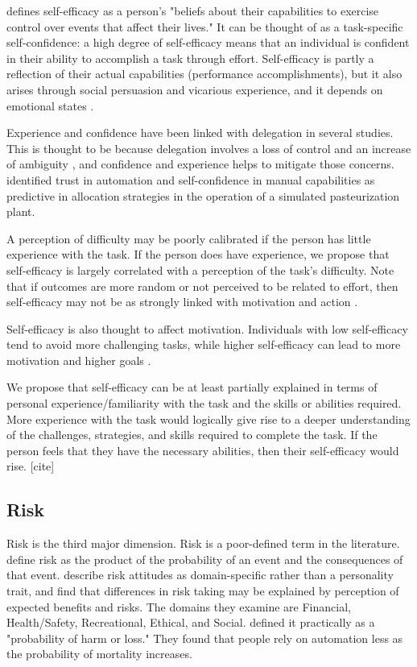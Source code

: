 \documentclass[letterpaper]{article} %
\begin{document}
\cite{Bandura-89} defines self-efficacy as a person's "beliefs about their capabilities to exercise control over events that affect their lives." It can be thought of as a task-specific self-confidence: a high degree of self-efficacy means that an individual is confident in their ability to accomplish a task through effort. Self-efficacy  is partly a reflection of their actual capabilities (performance accomplishments), but it also arises through social persuasion and vicarious experience, and it depends on emotional states \cite{Bandura-89}.

Experience and confidence have been linked with delegation in several studies. This is thought to be because delegation involves a loss of control and an increase of ambiguity \cite{milewski1}, and confidence and experience helps to mitigate those concerns. \cite{Lee-1994} identified trust in automation and self-confidence in manual capabilities as predictive in allocation strategies in the operation of a simulated pasteurization plant. 

A perception of difficulty may be poorly calibrated if the person has little experience with the task. If the person does have experience, we propose that self-efficacy is largely correlated with a perception of the task's difficulty. Note that if outcomes are more random or not perceived to be related to effort, then self-efficacy may not be as strongly linked with motivation and action \cite{Bandura-agency}.

Self-efficacy is also thought to affect motivation.  Individuals with low self-efficacy tend to avoid more challenging tasks, while higher self-efficacy can lead to more motivation and higher goals \cite{Bandura-89}.

We propose that self-efficacy can be at least partially explained in terms of personal experience/familiarity with the task and the skills or abilities required. More experience with the task would logically give rise to a deeper understanding of the challenges, strategies, and skills required to complete the task. If the person feels that they have the necessary abilities, then their self-efficacy would rise. [cite]

\subsection{Risk}
Risk is the third major dimension. Risk is a poor-defined term in the literature. \cite{sheridan-risk-2008} define risk as the product of the probability of an event and the consequences of that event. \cite{weber-risk-2002} describe risk attitudes as domain-specific rather than a personality trait, and find that differences in risk taking may be explained by perception of expected benefits and risks. The domains they examine are Financial, Health/Safety, Recreational, Ethical, and Social. \cite{perkins-risk-2010} defined it practically as a "probability of harm or loss." They found that people rely on automation less as the probability of mortality increases.
\end{document}
